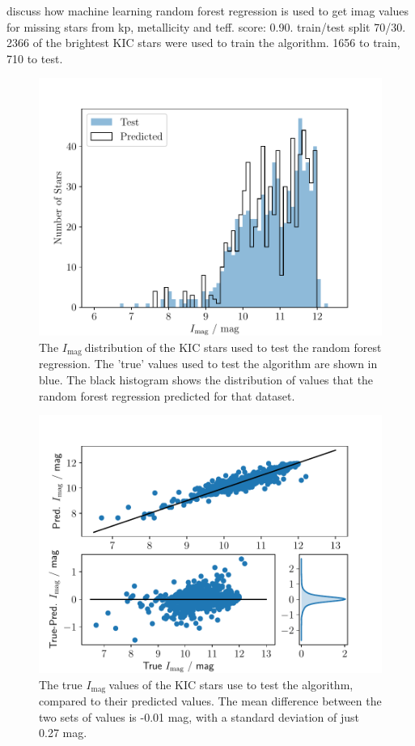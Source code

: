 \documentclass[a4paper,fleqn,usenatbib,useAMS]{mnras}
\newcommand{\imag}{\ensuremath{I_{\textrm{mag}}\:}}
\begin{document}
discuss how machine learning random forest regression is used to get imag values for missing stars from kp, metallicity and teff. score: 0.90. train/test split 70/30. 2366 of the brightest KIC stars were used to train the algorithm. 1656 to train, 710 to test.
\begin{figure}
	\centering
	\includegraphics[scale=0.5]{Plot3_Imag_tested_distribution_50kstars}
	\caption{The \imag distribution of the KIC stars used to test the random forest regression. The 'true' values used to test the algorithm are shown in blue. The black histogram shows the distribution of values that the random forest regression predicted for that dataset.}	
	\label{fig:imag test}
\end{figure}
\begin{figure}
	\centering
	\includegraphics[scale=0.5]{Plot4_Imag_scatter_50kstars}
	\caption{The true \imag values of the KIC stars use to test the algorithm, compared to their predicted values. The mean difference between the two sets of values is -0.01 mag, with a standard deviation of just 0.27 mag.}	
	\label{fig:imag test}
\end{figure}
\end{document}
